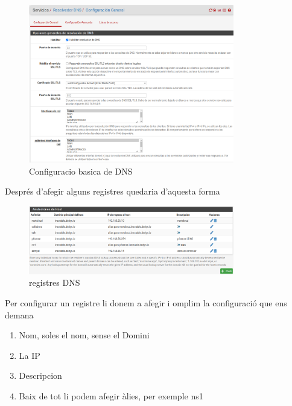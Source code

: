 \documentclass[
  10pt,
]{krantz}
\providecommand{\tightlist}{%
  \setlength{\itemsep}{0pt}\setlength{\parskip}{0pt}}
\begin{document}
\begin{figure}
\centering
\includegraphics[width=0.8\textwidth,height=\textheight]{imatges/proxmox/DNS1.png}
\caption{Configuracio basica de DNS}
\end{figure}

Després d'afegir alguns registres quedaria d'aquesta forma

\begin{figure}
\centering
\includegraphics[width=0.8\textwidth,height=\textheight]{imatges/proxmox/DNS2.png}
\caption{registres DNS}
\end{figure}

Per configurar un registre li donem a afegir i omplim la configuració que ens demana

\begin{enumerate}
\def\labelenumi{\arabic{enumi}.}
\tightlist
\item
  Nom, soles el nom, sense el Domini
\item
  La IP
\item
  Descripcion
\item
  Baix de tot li podem afegir àlies, per exemple ns1
\end{enumerate}
\end{document}

